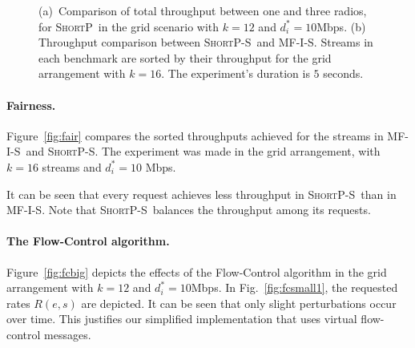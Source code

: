 \documentclass[11pt]{article}
\newenvironment{proof sketch}[1]{\noindent {\emph{Proof sketch of #1:}}}{\hfill \qed}
\newcommand{\algA}{\textsc{MF-I-S}}
\newcommand{\algB}{\textsc{ShortP}}
\newcommand{\algBS}{\textsc{ShortP-S}}
\newcommand{\algS}{\algB}
\begin{document}
\begin{figure}%
  \centering {}
  \caption{ (a)~Comparison of total throughput between one and three
    radios, for \algS\ in the grid scenario with $k=12$ and
    $d^*_i=10$Mbps. (b)~ Throughput comparison between \algBS\ and
    \algA. Streams in each benchmark are sorted by their throughput
    for the grid arrangement with $k=16$. The experiment's duration is
    $5$ seconds. }
\end{figure}

\paragraph{Fairness.}
Figure~\ref{fig:fair} compares the sorted throughputs achieved for the
streams in \algA\ and \algBS.  The experiment was made in the grid
arrangement, with $k=16$ streams and $d^*_i=10$ Mbps.

It can be seen that every request achieves less throughput in \algBS\
than in \algA.  Note that \algBS\ balances the throughput among its
requests.

\paragraph{The Flow-Control algorithm.}

Figure~\ref{fig:fcbig} depicts the effects of the Flow-Control
algorithm in the grid arrangement with $k=12$ and $d^*_i=10$Mbps.  In
Fig.~\ref{fig:fcsmall1}, the requested rates $R(e,s)$ are depicted. It
can be seen that only slight perturbations occur over time. This
justifies our simplified implementation that uses virtual flow-control
messages.
\end{document}
